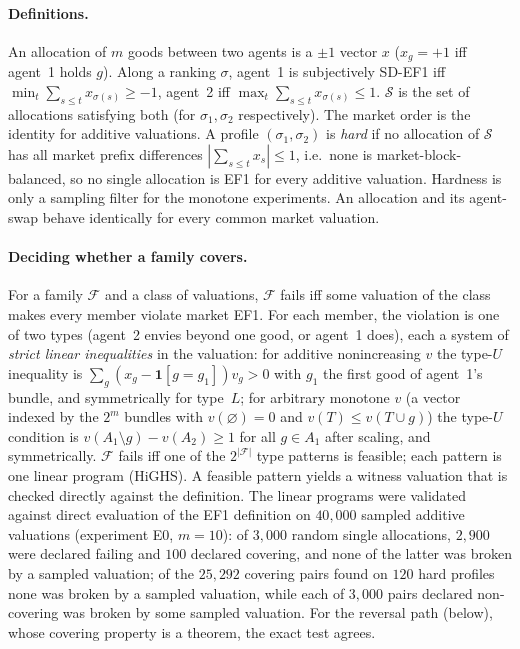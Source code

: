 \documentclass[11pt]{article}
\theoremstyle{definition}
\begin{document}
\paragraph{Definitions.}
An allocation of $m$ goods between two agents is a $\pm1$ vector $x$ ($x_g=+1$ iff agent~1 holds $g$). Along a ranking $\sigma$, agent~1 is subjectively SD-EF1 iff $\min_t\sum_{s\le t}x_{\sigma(s)}\ge-1$, agent~2 iff $\max_t\sum_{s\le t}x_{\sigma(s)}\le1$. $\mathcal S$ is the set of allocations satisfying both (for $\sigma_1,\sigma_2$ respectively). The market order is the identity for additive valuations. A profile $(\sigma_1,\sigma_2)$ is \emph{hard} if no allocation of $\mathcal S$ has all market prefix differences $|\sum_{s\le t}x_s|\le1$, i.e.\ none is market-block-balanced, so no single allocation is EF1 for every additive valuation. Hardness is only a sampling filter for the monotone experiments. An allocation and its agent-swap behave identically for every common market valuation.

\paragraph{Deciding whether a family covers.}
For a family $\mathcal F$ and a class of valuations, $\mathcal F$ fails iff some valuation of the class makes every member violate market EF1. For each member, the violation is one of two types (agent~2 envies beyond one good, or agent~1 does), each a system of \emph{strict linear inequalities} in the valuation: for additive nonincreasing $v$ the type-$U$ inequality is $\sum_g(x_g-\mathbf 1[g=g_1])v_g>0$ with $g_1$ the first good of agent~1's bundle, and symmetrically for type~$L$; for arbitrary monotone $v$ (a vector indexed by the $2^m$ bundles with $v(\varnothing)=0$ and $v(T)\le v(T\cup g)$) the type-$U$ condition is $v(A_1\setminus g)-v(A_2)\ge1$ for all $g\in A_1$ after scaling, and symmetrically. $\mathcal F$ fails iff one of the $2^{|\mathcal F|}$ type patterns is feasible; each pattern is one linear program (HiGHS). A feasible pattern yields a witness valuation that is checked directly against the definition.
The linear programs were validated against direct evaluation of the EF1 definition on $40{,}000$ sampled additive valuations (experiment E0, $m=10$): of $3{,}000$ random single allocations, $2{,}900$ were declared failing and $100$ declared covering, and none of the latter was broken by a sampled valuation; of the $25{,}292$ covering pairs found on $120$ hard profiles none was broken by a sampled valuation, while each of $3{,}000$ pairs declared non-covering was broken by some sampled valuation. For the reversal path (below), whose covering property is a theorem, the exact test agrees.
\end{document}
